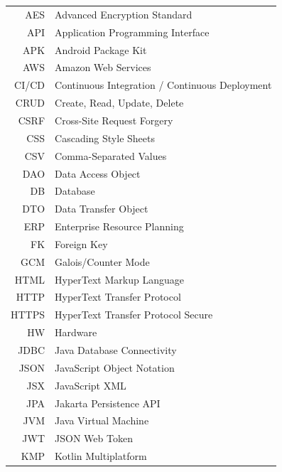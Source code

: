 \documentclass[czech,bachelor,oneside]{ctufit-thesis}
\begin{document}
\chapter{\thectufitabbreviationlabel}

\begin{tabular}{rl}
	AES    & Advanced Encryption Standard                     \\
	API    & Application Programming Interface               \\
	APK    & Android Package Kit                             \\
	AWS    & Amazon Web Services                             \\
	CI/CD  & Continuous Integration / Continuous Deployment   \\
	CRUD   & Create, Read, Update, Delete                    \\
	CSRF   & Cross-Site Request Forgery                      \\
	CSS    & Cascading Style Sheets                          \\
	CSV    & Comma-Separated Values                          \\
	DAO    & Data Access Object                              \\
	DB     & Database                                        \\
	DTO    & Data Transfer Object                            \\
	ERP    & Enterprise Resource Planning                    \\
	FK     & Foreign Key                                     \\
	GCM    & Galois/Counter Mode                             \\
	HTML   & HyperText Markup Language                       \\
	HTTP   & HyperText Transfer Protocol                     \\
	HTTPS  & HyperText Transfer Protocol Secure              \\
	HW     & Hardware                                        \\
	JDBC   & Java Database Connectivity                      \\
	JSON   & JavaScript Object Notation                      \\
	JSX    & JavaScript XML                                  \\
	JPA    & Jakarta Persistence API                         \\
	JVM    & Java Virtual Machine                            \\
	JWT    & JSON Web Token                                  \\
	KMP    & Kotlin Multiplatform                            \\
\end{tabular}
\end{document}
